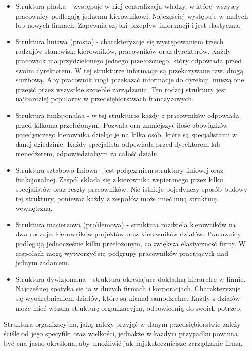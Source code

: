 \begin{itemize}
    \item Struktura płaska - występuje w niej centralizacja władzy, w której wszyscy pracownicy podlegają jednemu kierownikowi. Najczęściej występuje w małych lub nowych firmach. Zapewnia szybki przepływ informacji i jest elastyczna.

    \item Struktura liniowa (prosta) - charakteryzuje się występowaniem trzech rodzajów stanowisk: kierowników, pracowników oraz dyrektorów. Każdy pracownik ma przydzielonego jednego przełożonego, który odpowiada przed swoim dyrektorem. W tej strukturze informacje są przekazywane tzw. drogą służbową. Aby pracownik mógł przekazać informacje do dyrekcji, muszą one przejść przez wszystkie szczeble zarządzania. Ten rodzaj struktury jest najbardziej popularny w przedsiębiorstwach franczyzowych.

    \item Struktura funkcjonalna - w tej strukturze każdy z pracowników odpowiada przed kilkoma przełożonymi. Pozwala ona zmniejszyć ilość obowiązków pojedynczego kierownika dzieląc je na kilka osób, które są specjalistami w danej dziedzinie. Każdy specjalista odpowiada przed dyrektorem lub menedżerem, odpowiedzialnym za całość działu.

    \item Struktura sztabowo-liniowa - jest połączeniem struktury liniowej oraz funkcjonalnej. Zespół składa się z kierownika wspieranego przez kilku specjalistów oraz reszty pracowników. Nie istnieje pojedynczy sposób budowy tej struktury, ponieważ każdy z zespołów może mieć inną strukturę wewnętrzną.

    \item Struktura macierzowa (problemowa) - struktura rozdziela kierowników na dwa rodzaje: kierowników projektów oraz kierowników działów. Pracownicy podlegają jednocześnie kilku przełożonym, co zwiększa elastyczność firmy. W zespołach mogą wytworzyć się podgrupy pracowników pracujących nad jednym zadaniem.

    \item Struktura dywizjonalna - struktura określająca dokładną hierarchię w firmie. Najczęściej spotyka się ją w dużych firmach i korporacjach. Charakteryzuje się wyodrębnieniem działów, które są niemal samodzielne. Każdy z działów może mieć własną strukturę organizacyjną, odpowiednią do swoich potrzeb.
\end{itemize}

Struktura organizacyjna, jaką należy przyjąć w danym przedsiębiorstwie zależy ściśle od jego specyfiki oraz wielkości, jednakże w każdym przypadku powinna być ona jasno określona, aby umożliwić jak najskuteczniejsze zarządzanie firmą.

